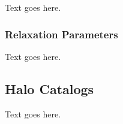 Text goes here.



\subsubsection{Relaxation Parameters}
\label{subsubsec:rockstar--halo_properties--relaxation}


Text goes here.




\subsection{Halo Catalogs}
\label{subsec:rockstar--halo_catalogs}


Text goes here.




